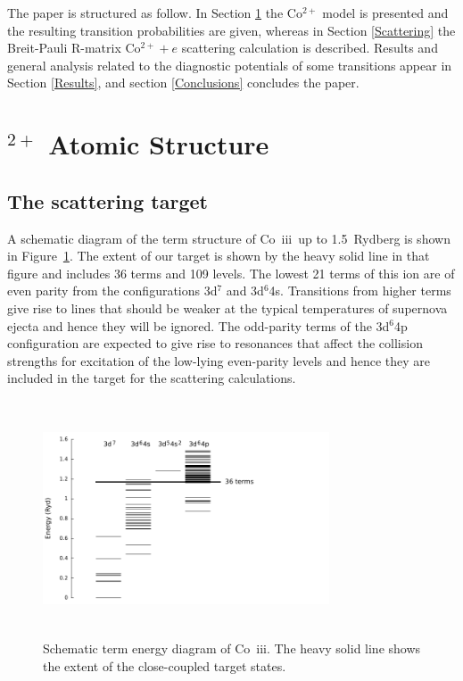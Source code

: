 \documentclass[useAMS,usenatbib]{mn2e}
\newcommand{\III}     {~{\sc iii}}
\begin{document}
The paper is structured as follow. In Section \ref{AtomicStructure} the Co$^{2+}$ model is
presented and the resulting transition probabilities are given, whereas in Section \ref{Scattering}
the Breit-Pauli R-matrix Co$^{2+}+e$ scattering calculation is described. Results and general
analysis related to the diagnostic potentials of some transitions appear in Section \ref{Results},
and section \ref{Conclusions} concludes the paper.

\section{$^{2+}$ Atomic Structure} \label{AtomicStructure}

\subsection{The scattering target}

A schematic diagram of the term structure of Co\III\ up to 1.5~Rydberg is shown in
Figure~\ref{termdiagram}. The extent of our target is shown by the heavy solid line in that figure
and includes 36 terms and 109 levels. The lowest 21 terms of this ion are of even parity from the
configurations 3d$^7$ and 3d$^6$4s. Transitions from higher terms give rise to lines that should be
weaker at the typical temperatures of supernova ejecta and hence they will be ignored. The
odd-parity terms of the 3d$^6$4p configuration are expected to give rise to resonances that affect
the collision strengths for excitation of the low-lying even-parity levels and hence they are
included in the target for the scattering calculations.

\begin{figure}
\centering
\includegraphics[height=7cm, width=8.5cm]{g/Co3cfdiagx}
\caption[]{Schematic term energy diagram of Co\III. The heavy solid line shows the extent of the
close-coupled target states. \label{termdiagram}}
\end{figure}
\end{document}
